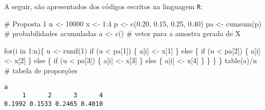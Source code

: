 \documentclass[
  letterpaper,
  DIV=11,
  numbers=noendperiod]{scrreprt}
\newenvironment{Shaded}{\begin{snugshade}}{\end{snugshade}}
\newcommand{\CommentTok}[1]{\textcolor[rgb]{0.37,0.37,0.37}{#1}}
\newcommand{\ControlFlowTok}[1]{\textcolor[rgb]{0.00,0.23,0.31}{#1}}
\newcommand{\DecValTok}[1]{\textcolor[rgb]{0.68,0.00,0.00}{#1}}
\newcommand{\FloatTok}[1]{\textcolor[rgb]{0.68,0.00,0.00}{#1}}
\newcommand{\FunctionTok}[1]{\textcolor[rgb]{0.28,0.35,0.67}{#1}}
\newcommand{\NormalTok}[1]{\textcolor[rgb]{0.00,0.23,0.31}{#1}}
\newcommand{\OtherTok}[1]{\textcolor[rgb]{0.00,0.23,0.31}{#1}}
\newcommand{\SpecialCharTok}[1]{\textcolor[rgb]{0.37,0.37,0.37}{#1}}
\begin{document}
A seguir, são apresentados dos códigos escritos na linguagem \texttt{R}:

\begin{Shaded}
\begin{Highlighting}[]
\CommentTok{\# Proposta 1}
\NormalTok{n }\OtherTok{\textless{}{-}} \DecValTok{10000}
\NormalTok{x }\OtherTok{\textless{}{-}} \DecValTok{1}\SpecialCharTok{:}\DecValTok{4} 
\NormalTok{p }\OtherTok{\textless{}{-}} \FunctionTok{c}\NormalTok{(}\FloatTok{0.20}\NormalTok{, }\FloatTok{0.15}\NormalTok{, }\FloatTok{0.25}\NormalTok{, }\FloatTok{0.40}\NormalTok{)}
\NormalTok{pa }\OtherTok{\textless{}{-}} \FunctionTok{cumsum}\NormalTok{(p) }\CommentTok{\# probabilidades acumuladas}
\NormalTok{a  }\OtherTok{\textless{}{-}} \FunctionTok{c}\NormalTok{() }\CommentTok{\# vetor para a amostra gerada de X}

\ControlFlowTok{for}\NormalTok{(i }\ControlFlowTok{in} \DecValTok{1}\SpecialCharTok{:}\NormalTok{n)\{}
\NormalTok{  u }\OtherTok{\textless{}{-}} \FunctionTok{runif}\NormalTok{(}\DecValTok{1}\NormalTok{)}
  \ControlFlowTok{if}\NormalTok{ (u }\SpecialCharTok{\textless{}}\NormalTok{ pa[}\DecValTok{1}\NormalTok{]) \{}
\NormalTok{    a[i] }\OtherTok{\textless{}{-}}\NormalTok{ x[}\DecValTok{1}\NormalTok{]}
\NormalTok{  \} }\ControlFlowTok{else}\NormalTok{ \{ }
      \ControlFlowTok{if}\NormalTok{ (u }\SpecialCharTok{\textless{}}\NormalTok{ pa[}\DecValTok{2}\NormalTok{]) \{}
\NormalTok{        a[i] }\OtherTok{\textless{}{-}}\NormalTok{ x[}\DecValTok{2}\NormalTok{]}
\NormalTok{      \} }\ControlFlowTok{else}\NormalTok{ \{ }\ControlFlowTok{if}\NormalTok{ (u }\SpecialCharTok{\textless{}}\NormalTok{ pa[}\DecValTok{3}\NormalTok{]) \{}
\NormalTok{        a[i] }\OtherTok{\textless{}{-}}\NormalTok{ x[}\DecValTok{3}\NormalTok{]}
\NormalTok{      \} }\ControlFlowTok{else}\NormalTok{ \{ }
\NormalTok{          a[i] }\OtherTok{\textless{}{-}}\NormalTok{ x[}\DecValTok{4}\NormalTok{]}
\NormalTok{          \}}
\NormalTok{      \}}
\NormalTok{    \}}
\NormalTok{\}}
\FunctionTok{table}\NormalTok{(a)}\SpecialCharTok{/}\NormalTok{n }\CommentTok{\# tabela de proporções}
\end{Highlighting}
\end{Shaded}

\begin{verbatim}
a
     1      2      3      4 
0.1992 0.1533 0.2465 0.4010 
\end{verbatim}
\end{document}

